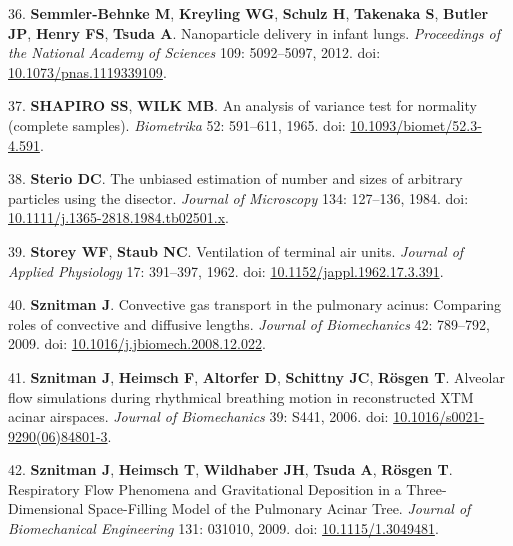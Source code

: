 \documentclass[
  american,
]{article}
\newenvironment{cslreferences}%
  {}%
  {\par}
\begin{document}
\begin{cslreferences}
\leavevmode\hypertarget{ref-yHHhvOtP}{}%
36. \textbf{Semmler-Behnke M}, \textbf{Kreyling WG}, \textbf{Schulz H}, \textbf{Takenaka S}, \textbf{Butler JP}, \textbf{Henry FS}, \textbf{Tsuda A}. Nanoparticle delivery in infant lungs. \emph{Proceedings of the National Academy of Sciences} 109: 5092--5097, 2012. doi: \href{https://doi.org/10.1073/pnas.1119339109}{10.1073/pnas.1119339109}.

\leavevmode\hypertarget{ref-IkHrgIj3}{}%
37. \textbf{SHAPIRO SS}, \textbf{WILK MB}. An analysis of variance test for normality (complete samples). \emph{Biometrika} 52: 591--611, 1965. doi: \href{https://doi.org/10.1093/biomet/52.3-4.591}{10.1093/biomet/52.3-4.591}.

\leavevmode\hypertarget{ref-FJ9FoB4m}{}%
38. \textbf{Sterio DC}. The unbiased estimation of number and sizes of arbitrary particles using the disector. \emph{Journal of Microscopy} 134: 127--136, 1984. doi: \href{https://doi.org/10.1111/j.1365-2818.1984.tb02501.x}{10.1111/j.1365-2818.1984.tb02501.x}.

\leavevmode\hypertarget{ref-WDrIHn9p}{}%
39. \textbf{Storey WF}, \textbf{Staub NC}. Ventilation of terminal air units. \emph{Journal of Applied Physiology} 17: 391--397, 1962. doi: \href{https://doi.org/10.1152/jappl.1962.17.3.391}{10.1152/jappl.1962.17.3.391}.

\leavevmode\hypertarget{ref-RJ9GQcwl}{}%
40. \textbf{Sznitman J}. Convective gas transport in the pulmonary acinus: Comparing roles of convective and diffusive lengths. \emph{Journal of Biomechanics} 42: 789--792, 2009. doi: \href{https://doi.org/10.1016/j.jbiomech.2008.12.022}{10.1016/j.jbiomech.2008.12.022}.

\leavevmode\hypertarget{ref-k5fqLjiy}{}%
41. \textbf{Sznitman J}, \textbf{Heimsch F}, \textbf{Altorfer D}, \textbf{Schittny JC}, \textbf{Rösgen T}. Alveolar flow simulations during rhythmical breathing motion in reconstructed XTM acinar airspaces. \emph{Journal of Biomechanics} 39: S441, 2006. doi: \href{https://doi.org/10.1016/s0021-9290(06)84801-3}{10.1016/s0021-9290(06)84801-3}.

\leavevmode\hypertarget{ref-afF83siN}{}%
42. \textbf{Sznitman J}, \textbf{Heimsch T}, \textbf{Wildhaber JH}, \textbf{Tsuda A}, \textbf{Rösgen T}. Respiratory Flow Phenomena and Gravitational Deposition in a Three-Dimensional Space-Filling Model of the Pulmonary Acinar Tree. \emph{Journal of Biomechanical Engineering} 131: 031010, 2009. doi: \href{https://doi.org/10.1115/1.3049481}{10.1115/1.3049481}.


\end{cslreferences}
\end{document}
